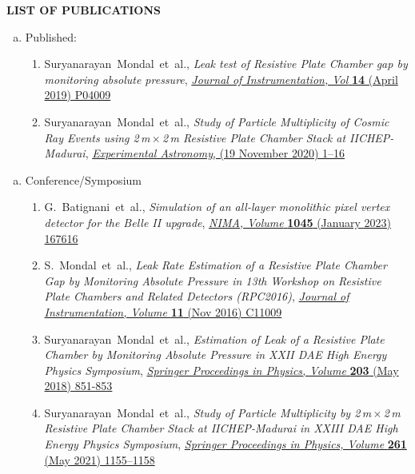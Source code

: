 \documentclass[12pt]{article}
\begin{document}
\pagebreak
\vspace{0.4cm}
\colorbox{gray!40}{\begin{minipage}{17.5cm}
\bf {LIST OF PUBLICATIONS} 
\end{minipage} }
\begin{minipage}{1.05\textwidth}
  \vspace{0.4cm}
  \begin{enumerate}[a.]
  \item Published:
    \begin{enumerate}[1.]
    \item Suryanarayan~Mondal~et~al., \emph{Leak test of Resistive Plate Chamber gap by monitoring absolute pressure}, \href{https://doi.org/10.1088/1748-0221/14/04/P04009}{\emph{Journal of Instrumentation, Vol} \textbf{14} (April 2019) P04009}
    \item Suryanarayan~Mondal~et~al., \emph{Study of Particle Multiplicity of Cosmic Ray Events using 2\,m\,$\times$\,2\,m Resistive Plate Chamber Stack at IICHEP-Madurai}, \href{https://doi.org/10.1007/s10686-020-09685-6}{\emph{Experimental Astronomy}, (19 November 2020) 1--16}
    \end{enumerate} 
  \end{enumerate} 
  \begin{enumerate}[b.]
  \item Conference/Symposium
    \begin{enumerate}[1.]
    \item G.~Batignani~et~al., \emph{Simulation of an all-layer monolithic pixel vertex detector for the Belle II upgrade}, \href{https://doi.org/10.1016/j.nima.2022.167616}{\emph{NIMA, Volume } \textbf{1045} (January 2023) 167616}
    \item S.~Mondal~et~al., \emph{Leak Rate Estimation of a Resistive Plate Chamber Gap by Monitoring Absolute Pressure in 13th Workshop on Resistive Plate Chambers and Related Detectors (RPC2016)}, \href{https://doi.org/10.1088/1748-0221/11/11/C11009}{\emph{Journal of Instrumentation, Volume } \textbf{11} (Nov 2016) C11009}
    \item Suryanarayan~Mondal~et~al., \emph{Estimation of Leak of a Resistive Plate Chamber by Monitoring Absolute Pressure in XXII DAE High Energy Physics Symposium}, \href{https://doi.org/10.1007/978-3-319-73171-1_207}{\emph{Springer Proceedings in Physics, Volume } \textbf{203} (May 2018) 851-853}
    \item Suryanarayan~Mondal~et~al., \emph{Study of Particle Multiplicity by 2\,m\,$\times$\,2\,m Resistive Plate Chamber Stack at IICHEP-Madurai in XXIII DAE High Energy Physics Symposium}, \href{https://doi.org/10.1007/978-981-33-4408-2_172}{\emph{Springer Proceedings in Physics, Volume } \textbf{261} (May 2021) 1155--1158}

\end{enumerate}
\end{enumerate}
\end{minipage}
\end{document}
